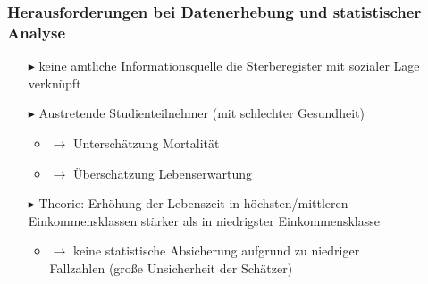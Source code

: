 \documentclass{beamer}
\begin{document}
\begin{frame}
\frametitle{Herausforderungen bei Datenerhebung und statistischer Analyse}
	\begin{itemize}
		\item [$\blacktriangleright$] keine amtliche Informationsquelle die 	Sterberegister mit sozialer Lage verknüpft
		\item [$\blacktriangleright$] Austretende Studienteilnehmer (mit schlechter Gesundheit)
			\begin{itemize}
				\item $\rightarrow$ Unterschätzung Mortalität
				\item $\rightarrow$ Überschätzung Lebenserwartung
			\end{itemize}
		\item [$\blacktriangleright$]Theorie: Erhöhung der Lebenszeit in höchsten/mittleren Einkommensklassen stärker als in niedrigster Einkommensklasse
		\begin{itemize}
			\item $\rightarrow$ keine statistische Absicherung aufgrund zu niedriger\\
			\hspace{0.4cm} Fallzahlen (große Unsicherheit der Schätzer)
		\end{itemize}
	\end{itemize}
\end{frame}
 
 
\end{document}
